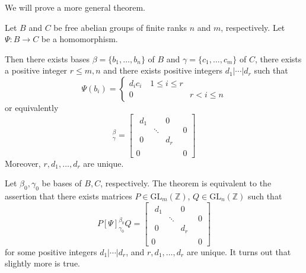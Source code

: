 \documentclass{article}
\begin{document}
We will prove a more general theorem.
\begin{idea}
Let $B$ and $C$ be free abelian groups of finite ranks $n$ and $m$, respectively. Let $\Psi: B\rightarrow C$ be a homomorphism.
\vspace{2mm}

Then there exists bases $\beta=\{b_1,\dots,b_n\}$ of $B$ and $\gamma=\{c_1,\dots,c_m\}$ of $C$, there exists a positive integer $r \le m,n$ and there exists positive integers $d_1|\cdots | d_r$ such that
\begin{equation}
    \Psi(b_i) = \begin{cases}
        d_ic_i\quad 1\le i \le r \\
        0 & r < i \le n
    \end{cases}
\end{equation}
or equivalently
\begin{equation}
    [\Psi]^\beta_\gamma =
    \left[
        \begin{array}{c|c}
            \begin{array}{ccc}
                d_1 &        & 0   \\
                    & \ddots &     \\
                0   &        & d_r
            \end{array} & 0 \\
            \hline
            0                          & 0
        \end{array}
        \right]
\end{equation}
Moreover, $r,d_1,\dots,d_r$ are unique.
\end{idea}
Let $\beta_0,\gamma_0$ be bases of $B,C$, respectively. The theorem is equivalent to the assertion that there exists matrices $P\in \text{GL}_m(\mathbb{Z})$, $Q\in \text{GL}_n(\mathbb{Z})$ such that
\begin{equation}
    P[\Psi]_{\gamma_0}^{\beta_0}Q =     \left[
        \begin{array}{c|c}
            \begin{array}{ccc}
                d_1 &        & 0   \\
                    & \ddots &     \\
                0   &        & d_r
            \end{array} & 0 \\
            \hline
            0                          & 0
        \end{array}
        \right]
\end{equation}
for some positive integers $d_1|\cdots |d_r$, and $r,d_1,\dots,d_r$ are unique. It turns out that slightly more is true.
\end{document}
